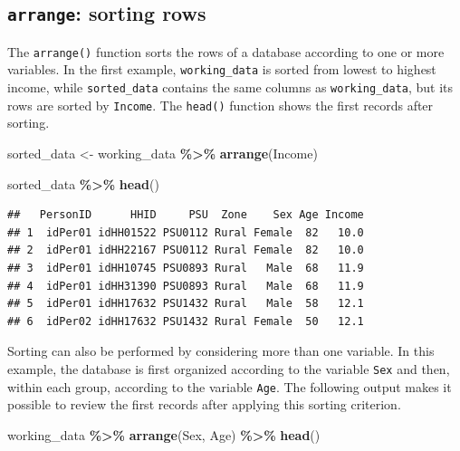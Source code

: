 \documentclass[
  english,
  12pt,
]{book}
\newenvironment{Shaded}{\begin{snugshade}}{\end{snugshade}}
\newcommand{\FunctionTok}[1]{\textcolor[rgb]{0.13,0.29,0.53}{\textbf{#1}}}
\newcommand{\NormalTok}[1]{#1}
\newcommand{\OtherTok}[1]{\textcolor[rgb]{0.56,0.35,0.01}{#1}}
\newcommand{\SpecialCharTok}[1]{\textcolor[rgb]{0.81,0.36,0.00}{\textbf{#1}}}
\begin{document}
\subsection{\texorpdfstring{\texttt{arrange}: sorting rows}{arrange: sorting rows}}\label{arrange-ordenamiento-de-filas}

The \texttt{arrange()} function sorts the rows of a database according to one or more variables. In the first example, \texttt{working\_data} is sorted from lowest to highest income, while \texttt{sorted\_data} contains the same columns as \texttt{working\_data}, but its rows are sorted by \texttt{Income}. The \texttt{head()} function shows the first records after sorting.

\begin{Shaded}
\begin{Highlighting}[]
\NormalTok{sorted\_data }\OtherTok{\textless{}{-}}\NormalTok{ working\_data }\SpecialCharTok{\%\textgreater{}\%}
  \FunctionTok{arrange}\NormalTok{(Income)}

\NormalTok{sorted\_data }\SpecialCharTok{\%\textgreater{}\%}
  \FunctionTok{head}\NormalTok{()}
\end{Highlighting}
\end{Shaded}

\begin{verbatim}
##   PersonID      HHID     PSU  Zone    Sex Age Income
## 1  idPer01 idHH01522 PSU0112 Rural Female  82   10.0
## 2  idPer01 idHH22167 PSU0112 Rural Female  82   10.0
## 3  idPer01 idHH10745 PSU0893 Rural   Male  68   11.9
## 4  idPer01 idHH31390 PSU0893 Rural   Male  68   11.9
## 5  idPer01 idHH17632 PSU1432 Rural   Male  58   12.1
## 6  idPer02 idHH17632 PSU1432 Rural Female  50   12.1
\end{verbatim}

Sorting can also be performed by considering more than one variable. In this example, the database is first organized according to the variable \texttt{Sex} and then, within each group, according to the variable \texttt{Age}. The following output makes it possible to review the first records after applying this sorting criterion.

\begin{Shaded}
\begin{Highlighting}[]
\NormalTok{working\_data }\SpecialCharTok{\%\textgreater{}\%}
  \FunctionTok{arrange}\NormalTok{(Sex, Age) }\SpecialCharTok{\%\textgreater{}\%}
  \FunctionTok{head}\NormalTok{()}
\end{Highlighting}
\end{Shaded}
\end{document}

